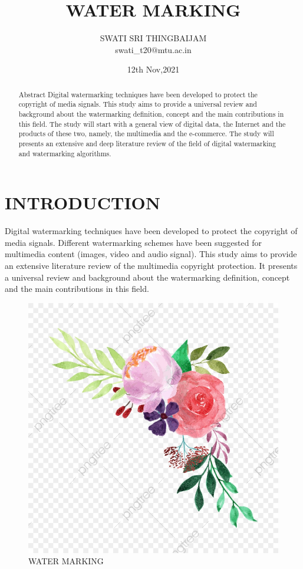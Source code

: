 \documentclass[12pt]{IEEEtran}
\title{\textbf{WATER MARKING}}
\author{SWATI SRI THINGBAIJAM \\swati\_t20$@$mtu.ac.in}
\date{12th Nov,2021}
\begin{document}
\begin{abstract}
Abstract
Digital watermarking techniques have been developed to protect the copyright of media signals. This study aims to provide a universal review and background about the watermarking definition, concept and the main contributions in this field. The study will start with a general view of digital data, the Internet and the products of these two, namely, the multimedia and the e-commerce. The study will presents an extensive and deep literature review of the field of digital watermarking and watermarking algorithms.
\end{abstract}
\section{INTRODUCTION}
Digital watermarking techniques have been developed to protect the copyright of media signals. Different watermarking schemes have been suggested for multimedia content (images, video and audio signal). This study aims to provide an extensive literature review of the multimedia copyright protection. It presents a universal review and background about the watermarking definition, concept and the main contributions in this field.\\
\centering
\begin{subfigure}{\linewidth}
\includegraphics[width=\linewidth]{flower}
\caption{WATER MARKING}
\end{subfigure}
\end{document}
